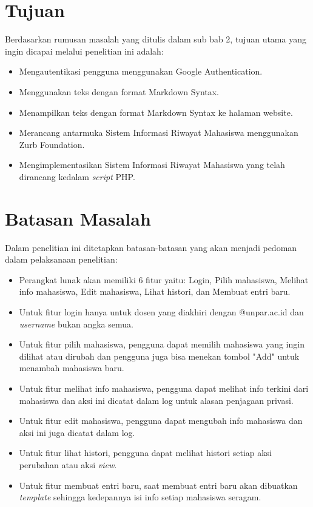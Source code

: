 \section{Tujuan}
Berdasarkan rumusan masalah yang ditulis dalam sub bab 2, tujuan utama yang
ingin dicapai melalui penelitian ini adalah:
\begin{itemize}
	\item Mengautentikasi pengguna menggunakan Google Authentication.
	\item Menggunakan teks dengan format Markdown Syntax.
	\item Menampilkan teks dengan format Markdown Syntax ke halaman website.
	\item Merancang antarmuka Sistem Informasi Riwayat Mahasiswa menggunakan Zurb
	Foundation.
	\item Mengimplementasikan Sistem Informasi Riwayat Mahasiswa yang telah
	dirancang kedalam {\it script} PHP.
\end{itemize}

\section{Batasan Masalah}
Dalam penelitian ini ditetapkan batasan-batasan yang akan menjadi pedoman dalam
pelaksanaan penelitian:
\begin{itemize}
	\item Perangkat lunak akan memiliki 6 fitur yaitu: Login, Pilih mahasiswa,
	Melihat info mahasiswa, Edit mahasiswa, Lihat histori, dan Membuat entri baru.
	\item Untuk fitur login hanya untuk dosen yang diakhiri dengan @unpar.ac.id dan
	{\it username} bukan angka semua.
	\item Untuk fitur pilih mahasiswa, pengguna dapat memilih mahasiswa yang ingin
	dilihat atau dirubah dan pengguna juga bisa menekan tombol "Add" untuk menambah
	mahasiswa baru.
	\item Untuk fitur melihat info mahasiswa, pengguna dapat melihat info terkini
	dari mahasiswa dan aksi ini dicatat dalam log untuk alasan penjagaan privasi.
	\item Untuk fitur edit mahasiswa, pengguna dapat mengubah info mahasiswa dan
	aksi ini juga dicatat dalam log.
	\item Untuk fitur lihat histori, pengguna dapat melihat histori setiap aksi
	perubahan atau aksi {\it view}.
	\item Untuk fitur membuat entri baru, saat membuat entri baru akan dibuatkan
	{\it template} sehingga kedepannya isi info setiap mahasiswa seragam.
\end{itemize}

